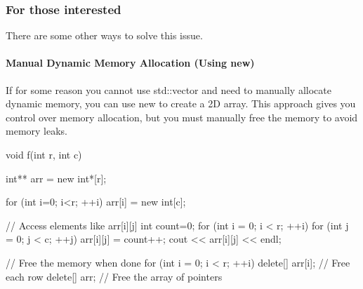 \documentclass{report}
\begin{document}
    \pagebreak 
    \subsubsection{For those interested}
    \bigbreak \noindent 
    There are some other ways to solve this issue.
    \bigbreak \noindent 
    \paragraph{Manual Dynamic Memory Allocation (Using new)}
    \bigbreak \noindent \bigbreak \noindent 
    If for some reason you cannot use std::vector and need to manually allocate dynamic memory, you can use new to create a 2D array. This approach gives you control over memory allocation, but you must manually free the memory to avoid memory leaks.
    \bigbreak \noindent 
    \begin{cppcode}
        void f(int r, int c) {
            int** arr = new int*[r];

            for (int i=0; i<r; ++i) {
                arr[i] = new int[c];
            }

            // Access elements like arr[i][j]
            int count=0;
            for (int i = 0; i < r; ++i) {
                for (int j = 0; j < c; ++j) {
                    arr[i][j] = count++;
                    cout << arr[i][j] << endl;
                }
            }

            // Free the memory when done
            for (int i = 0; i < r; ++i) {
                delete[] arr[i];  // Free each row
            }
            delete[] arr;  // Free the array of pointers
        }
    \end{cppcode}
    \bigbreak \noindent 

    \bigbreak \noindent 
\end{document}
